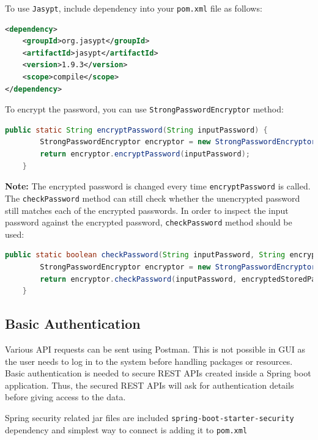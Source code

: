 To use \texttt{Jasypt}, include dependency into your \texttt{pom.xml} file as follows:
\begin{lstlisting}[language={XML}]
<dependency>
    <groupId>org.jasypt</groupId>
    <artifactId>jasypt</artifactId>
    <version>1.9.3</version>
    <scope>compile</scope>
</dependency>
\end{lstlisting}
To encrypt the password, you can use \texttt{StrongPasswordEncryptor} method:
\begin{lstlisting}[language={Java}]
    public static String encryptPassword(String inputPassword) {
        StrongPasswordEncryptor encryptor = new StrongPasswordEncryptor();
        return encryptor.encryptPassword(inputPassword);
    }
\end{lstlisting}

\textbf{Note:} The encrypted password is changed every time \texttt{encryptPassword} is called. The \texttt{checkPassword} method can still check whether the unencrypted password still matches each of the encrypted passwords. In order to inspect the input password against the encrypted password, \texttt{checkPassword} method should be used:

\begin{lstlisting}[language={Java}]
public static boolean checkPassword(String inputPassword, String encryptedStoredPassword) {
        StrongPasswordEncryptor encryptor = new StrongPasswordEncryptor();
        return encryptor.checkPassword(inputPassword, encryptedStoredPassword);
    }
\end{lstlisting}

\subsection{Basic Authentication}
\label{subsec:basic-auth}

Various API requests can be sent using Postman. This is not possible in GUI as the user needs to log in to the system before handling packages or resources. Basic authentication is needed to secure REST APIs created inside a Spring boot application. Thus, the secured REST APIs will ask for authentication details before giving access to the data.

Spring security related jar files are included \texttt{spring-boot-starter-security} dependency and simplest way to connect is adding it to \texttt{pom.xml}

